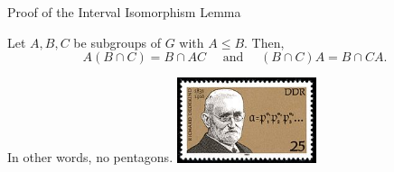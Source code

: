 \begin{frame}[fragile,label=Dedekind]{Proof of the Interval Isomorphism Lemma}
\vskip3mm
\begin{theorem}
  \label{lemma-dedekind}
Let $A, B, C$ be subgroups of $G$ with $A\leq B$.  Then,
\[
A(B\cap C) = B\cap AC \quad \text{ and }
\quad (B\cap C)A = B\cap CA.
\]
\end{theorem}
\vskip3mm
In other words, no pentagons.
\vskip3mm
\hfill    \includegraphics[height=25mm]{aux/Dedekind-stamp}
\end{frame}

